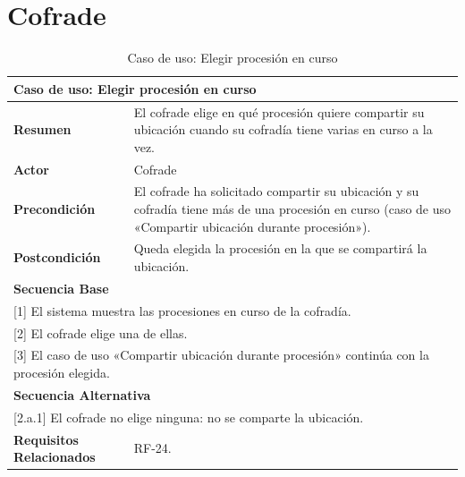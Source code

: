 \section{Cofrade}

\begin{table}[h!]
    \centering
    \renewcommand{\arraystretch}{1.5}

    \begin{tabular}{|p{4cm}|p{11cm}|}
        \hline
        \multicolumn{2}{|l|}{\textbf{Caso de uso: Elegir procesión en curso}} \\
        \hline
        \textbf{Resumen} & El cofrade elige en qué procesión quiere compartir su ubicación cuando su cofradía tiene varias en curso a la vez. \\
        \hline
        \textbf{Actor} & Cofrade \\
        \hline
        \textbf{Precondición} & El cofrade ha solicitado compartir su ubicación y su cofradía tiene más de una procesión en curso (caso de uso «Compartir ubicación durante procesión»). \\
        \hline
        \textbf{Postcondición} & Queda elegida la procesión en la que se compartirá la ubicación. \\
        \hline
        \multicolumn{2}{|l|}{\textbf{Secuencia Base}} \\
        \hline
        \multicolumn{2}{|p{15cm}|}{ [1] El sistema muestra las procesiones en curso de la cofradía. } \\
        \hline
        \multicolumn{2}{|p{15cm}|}{ [2] El cofrade elige una de ellas. } \\
        \hline
        \multicolumn{2}{|p{15cm}|}{ [3] El caso de uso «Compartir ubicación durante procesión» continúa con la procesión elegida. } \\
        \hline
        \multicolumn{2}{|l|}{\textbf{Secuencia Alternativa}} \\
        \hline
        \multicolumn{2}{|p{15cm}|}{ [2.a.1] El cofrade no elige ninguna: no se comparte la ubicación. } \\
        \hline
        \textbf{Requisitos Relacionados} & RF-24. \\
        \hline
    \end{tabular}
    \caption{Caso de uso: Elegir procesión en curso}
\end{table}

